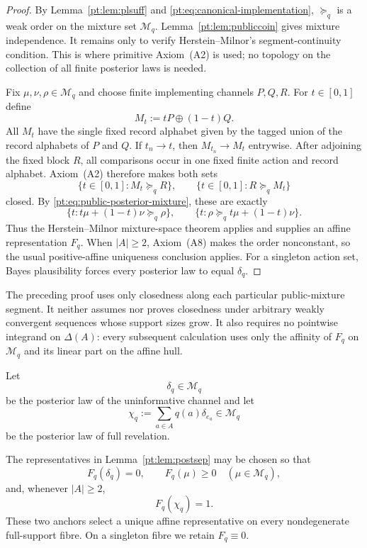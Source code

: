 \begin{proof}
By Lemma~\ref{pt:lem:plsuff} and
\eqref{pt:eq:canonical-implementation}, $\succeq_q$ is a weak order on the
mixture set $\mathcal M_q$.  Lemma~\ref{pt:lem:publiccoin} gives mixture
independence.  It remains only to verify Herstein--Milnor's segment-continuity
condition.  This is where primitive
Axiom~\textup{(A2)} is used; no topology on the collection of all finite
posterior laws is needed.

Fix $\mu,\nu,\rho\in\mathcal M_q$ and choose finite implementing channels
$P,Q,R$.  For $t\in[0,1]$ define
\[
 M_t:=tP\oplus(1-t)Q.
\]
All $M_t$ have the single fixed record alphabet given by the tagged union of
the record alphabets of $P$ and $Q$.  If $t_n\to t$, then $M_{t_n}\to M_t$
entrywise.  After adjoining the fixed block $R$, all comparisons occur in one
fixed finite action and record alphabet.  Axiom~\textup{(A2)} therefore makes
both sets
\[
 \{t\in[0,1]:M_t\succeq_q R\},
 \qquad
 \{t\in[0,1]:R\succeq_q M_t\}
\]
closed.  By \eqref{pt:eq:public-posterior-mixture}, these are exactly
\[
 \{t:t\mu+(1-t)\nu\succeq_q\rho\},
 \qquad
 \{t:\rho\succeq_qt\mu+(1-t)\nu\}.
\]
Thus the Herstein--Milnor mixture-space theorem
\cite{HersteinMilnor1953} applies and supplies an affine representation
$F_q$.  When $|A|\ge2$, Axiom~\textup{(A8)} makes the order nonconstant, so
the usual positive-affine uniqueness conclusion applies.  For a singleton
action set, Bayes plausibility forces every posterior law to equal
$\delta_q$.
\end{proof}

The preceding proof uses only closedness along each particular public-mixture
segment.  It neither assumes nor proves closedness under arbitrary weakly
convergent sequences whose support sizes grow.  It also requires no
pointwise integrand on $\Delta(A)$: every subsequent calculation uses only the
affinity of $F_q$ on $\mathcal M_q$ and its linear part on the affine hull.

Let
\[
 \delta_q\in\mathcal M_q
\]
be the posterior law of the uninformative channel and let
\[
 \chi_q:=\sum_{a\in A}q(a)\delta_{e_a}\in\mathcal M_q
\]
be the posterior law of full revelation.

\begin{lemma}\label{pt:lem:convnorm}
The representatives in Lemma~\ref{pt:lem:postsep} may be chosen so that
\begin{equation}
 F_q(\delta_q)=0,
 \qquad
 F_q(\mu)\ge0\quad(\mu\in\mathcal M_q),
 \label{pt:eq:zero-minimum}
\end{equation}
and, whenever $|A|\ge2$,
\begin{equation}
 F_q(\chi_q)=1.
 \label{pt:eq:full-revelation-anchor}
\end{equation}
These two anchors select a unique affine representative on every
nondegenerate full-support fibre.  On a singleton fibre we retain
$F_q\equiv0$.
\end{lemma}

